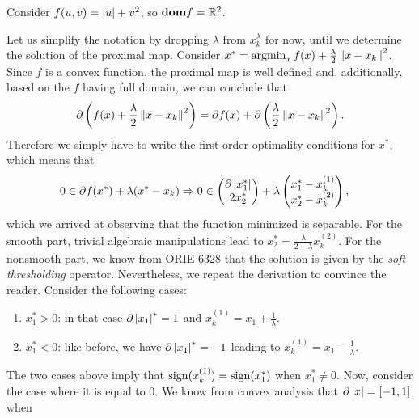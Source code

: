 \documentclass[10pt]{article}
\begin{document}
\allowdisplaybreaks
\everymath{\displaystyle}


\begin{Exercise}
	Consider $f(u, v) = \left| u \right| + v^2$, so $\textbf{dom} f = \mathbb{R}^2$.

	\ExePart

		Let us simplify the notation by dropping $\lambda$ from $x_k^{\lambda}$
		for now, until we determine the solution of the proximal map.
		Consider $x^* = \operatorname*{argmin}_{x} f(x) + \frac{\lambda}{2} \left \| x - x_k \right \|^2$.
		Since $f$ is a convex function, the proximal map is well defined and,
		additionally, based on the $f$ having full domain, we can conclude that
		\[
			\partial \left(f(x) + \frac{\lambda}{2} \left \| x - x_k \right \|^2 \right)
			= \partial f(x) + \partial \left( \frac{\lambda}{2} \left \| x -
			x_k \right \|^2 \right).
		\]
		Therefore we simply have to write the first-order optimality conditions
		for $x^*$, which means that
		\begin{align*}
			0 &\in \partial f(x^*) + \lambda ( x^* - x_k ) \Rightarrow
			0 \in \begin{pmatrix} \partial \left| x^*_1 \right| \\ 2 x^*_2 \end{pmatrix}
				+ \lambda \begin{pmatrix} x^*_1 - x_k^{(1)} \\ x^*_2 - x_k^{(2)}
				\end{pmatrix},
		\end{align*}
		which we arrived at observing that the function minimized is separable.
		For the smooth part, trivial algebraic manipulations lead to $x_2^* =
		\frac{\lambda}{2 + \lambda} x_k^{(2)}$. For the nonsmooth part, we
		know from ORIE 6328 that the solution is given by the
		\textit{soft thresholding} operator. Nevertheless, we repeat the
		derivation to convince the reader. Consider the following cases:
		\begin{enumerate}
			\item $x^*_1 > 0$: in that case $\partial \left| x_1 \right|^* = 1$ and
				$x_k^{(1)} = x_1 + \frac{1}{\lambda}$.
			\item $x^*_1 < 0$: like before, we have $\partial \left| x_1 \right|^* = -1$
				leading to $x_k^{(1)} = x_1 - \frac{1}{\lambda}$.
		\end{enumerate}
		The two cases above imply that $\mathrm{sign}(x_k^{(1)}) = \mathrm{sign}(x_1^*)$ when
		$x_1^* \neq 0$. Now, consider the case where it is equal to $0$. We
		know from convex analysis that $\partial \left| x \right| = [-1, 1]$ when

\end{Exercise}
\end{document}
